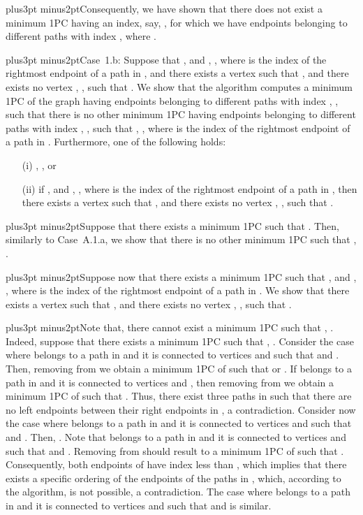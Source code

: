 \documentclass[10pt]{article}
\def\yskip{\penalty-50\vskip3pt plus3pt minus2pt}
\def\y{\yskip}
\begin{document}
{\y Consequently, we have shown that there does not exist a minimum
1PC  having an index, say, ,
for which we have  endpoints
 belonging to different paths with index , where
.

\y Case~1.b: Suppose that ,  and
, , where  is the index of the rightmost endpoint of a path
in , and there exists a vertex
 such that ,
 and there exists no vertex , ,
such that . We show
that the algorithm computes a minimum 1PC
 of the graph  having
 endpoints  belonging to different
paths with index , , such that
there is no other minimum 1PC 
having  endpoints  belonging to
different paths with index , , such that , , where  is the index of the rightmost
endpoint of a path in . Furthermore,
one of the following holds:
\begin{itemize}
\item[(i)] ,
, or \item[(ii)] if ,  and
, , where  is the index of the rightmost endpoint
of a path in , then there exists a
vertex  such that ,  and there exists no
vertex , , such that
.

\end{itemize}

\y Suppose that there exists a minimum 1PC
 such that
. Then,
similarly to Case~A.1.a, we show that there is no other minimum
1PC  such that
, .

\y Suppose now that there exists a minimum 1PC
 such that ,  and
, , where  is the index of the rightmost endpoint
of a path in . We show that there
exists a vertex  such that ,  and there exists no
vertex , , such that
.

\y Note that, there cannot exist a minimum 1PC
 such that , . Indeed,
suppose that there exists a minimum 1PC
 such that , . Consider the
case where  belongs to a path in
 and it is connected to vertices
 and  such that  and .
Then, removing  from  we
obtain a minimum 1PC of  such that
 or
. If  belongs to a path in
 and it is connected to vertices
 and , then removing  from
 we obtain a minimum 1PC of 
such that . Thus, there exist three paths in
 such that there are no left
endpoints between their right endpoints in , a contradiction.
Consider now the case where  belongs to a path in
 and it is connected to vertices
 and  such that  and .
Then, . Note that  belongs to a path
 in  and it is connected to
vertices  and  such that  and .
Removing  from  should result
to a minimum 1PC of  such that . Consequently, both endpoints of
 have index less than , which implies that there
exists a specific ordering of the endpoints of the paths in
, which, according to the
algorithm, is not possible, a contradiction. The case where 
belongs to a path in  and it is
connected to vertices  and  such that 
and  is similar.

}
\end{document}
